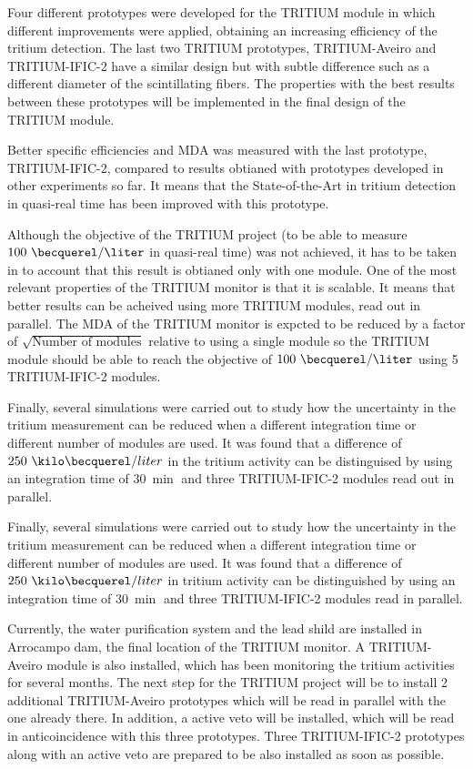 Four different prototypes were developed for the TRITIUM module in which different improvements were applied, obtaining an increasing efficiency of the tritium detection. The last two TRITIUM prototypes, TRITIUM-Aveiro and TRITIUM-IFIC-2 have a similar design but with subtle difference such as a different diameter of the scintillating fibers. The properties with the best results between these prototypes will be implemented in the final design of the TRITIUM module.

Better specific efficiencies and MDA was measured with the last prototype,  TRITIUM-IFIC-2, compared to results obtianed with prototypes developed in other experiments so far. It means that the State-of-the-Art in tritium detection in quasi-real time has been improved with this prototype. 

Although the objective of the TRITIUM project (to be able to measure $100~\becquerel/\liter$ in quasi-real time) was not achieved, it has to be taken in to account that this result is obtianed only with one module. One of the most relevant properties of the TRITIUM monitor is that it is scalable. It means that better results can be acheived using more TRITIUM modules, read out in parallel. The MDA of the TRITIUM monitor is expcted to be reduced by a factor of $\sqrt{\text{Number of modules}}$ relative to using a single module so the TRITIUM module should be able to reach the objective of $100~\becquerel/\liter$ using 5 TRITIUM-IFIC-2 modules.

Finally, several simulations were carried out to study how the uncertainty in the tritium measurement can be reduced when a different integration time or different number of modules are used. It was found that a difference of $250~\kilo\becquerel/liter$ in the tritium activity can be distinguised by using an integration time of $30~\min$ and three TRITIUM-IFIC-2 modules read out in parallel.

Finally, several simulations were carried out to study how the uncertainty in the tritium measurement can be reduced when a different integration time or different number of modules are used. It was found that a difference of $250~\kilo\becquerel/liter$ in tritium activity can be distinguished by using an integration time of $30~\min$ and three TRITIUM-IFIC-2 modules read in parallel.

Currently, the water purification system and the lead shild are installed in Arrocampo dam, the final location of the TRITIUM monitor. A TRITIUM-Aveiro module is also installed, which has been monitoring the tritium activities for several months. The next step for the TRITIUM project will be to install 2 additional TRITIUM-Aveiro prototypes which will be read in parallel with the one already there. In addition, a active veto will be installed, which will be read in anticoincidence with this three prototypes. Three TRITIUM-IFIC-2 prototypes along with an active veto are prepared to be also installed as soon as possible.

